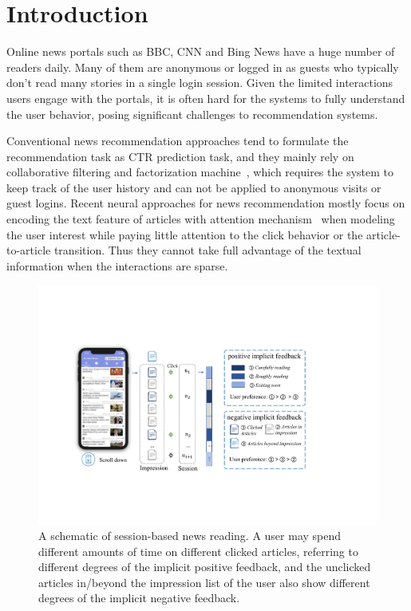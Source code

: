 \section{Introduction}
Online news portals such as BBC, CNN and Bing News have a huge number 
of readers daily. Many of them are anonymous or logged in as guests who typically don't read many stories in a single login session.
Given the limited interactions users engage with the portals, it is often 
hard for the systems to fully understand the user behavior, posing significant challenges to recommendation systems. 

Conventional news recommendation approaches tend to formulate the recommendation task as CTR prediction task, and they mainly rely on collaborative filtering and factorization machine~\cite{cheng2016wide,guodeepfm2017,wang2018modeling,ge2020graph,hu2020graph,xie2020deep}, 
which requires the system to keep track of the user history 
and can not be applied to anonymous visits or guest logins. 
Recent neural approaches for news recommendation mostly focus on encoding the text feature of articles with 
attention mechanism~\cite{wang2018dkn,zhu2019dan,wu_neural_2019-1,wu2019npa,wang2020fine,wu2020CPRS} 
when modeling the user interest while paying little attention to the click behavior or 
the article-to-article transition. Thus they cannot take full advantage of the textual information 
when the interactions are sparse.

\begin{figure}[th]
    \centering
    \includegraphics[width=\columnwidth]{fig/stream.pdf}
    \caption{A schematic of session-based news reading. 
    A user may spend different amounts of time on different clicked articles, referring to different degrees of the implicit positive feedback, and the unclicked articles in/beyond the impression list of the user also show different degrees of the implicit negative feedback. 
}
    \label{fig:session}
\end{figure}

